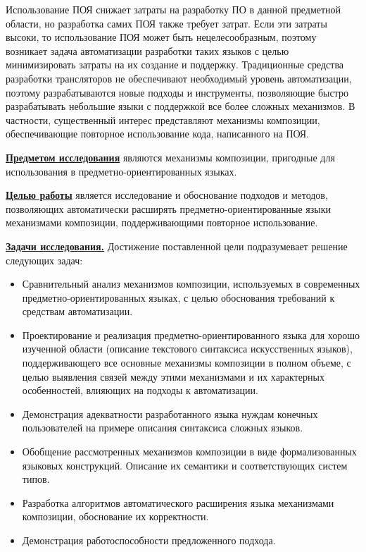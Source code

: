 \documentclass[12pt,a4paper]{article}
\theoremstyle{definition}
\theoremstyle{plain}
\newcommand{\afsubsection}[1]{\par \textbf{\underline{#1}}}
\begin{document}
Использование ПОЯ снижает затраты на разработку ПО в данной предметной области, но разработка самих ПОЯ также требует затрат. Если эти затраты высоки, то использование ПОЯ может быть нецелесообразным, поэтому возникает задача автоматизации разработки таких языков с целью минимизировать затраты на их создание и поддержку. Традиционные средства разработки трансляторов не обеспечивают необходимый уровень автоматизации, поэтому разрабатываются новые подходы и инструменты, позволяющие быстро разрабатывать небольшие языки с поддержкой все более сложных механизмов. В частности, существенный интерес представляют механизмы композиции, обеспечивающие повторное использование кода, написанного на ПОЯ. %

\afsubsection{Предметом исследования} являются механизмы композиции, пригодные для использования в предметно-ориентированных языках.

\afsubsection{Целью работы} является исследование и обоснование подходов и методов, позволяющих автоматически расширять предметно-ориентированные языки механизмами композиции, поддерживающими повторное использование.

\afsubsection{Задачи исследования.} Достижение поставленной цели подразумевает решение следующих задач:
\begin{itemize}
\item Сравнительный анализ механизмов композиции, используемых в современных предметно-ориентированных языках, с целью обоснования требований к средствам автоматизации.
\item Проектирование и реализация предметно-ориентированного языка для хорошо изученной области (описание текстового синтаксиса искусственных языков), поддерживающего все основные механизмы композиции в полном объеме, с целью выявления связей между этими механизмами и их характерных особенностей, влияющих на подходы к автоматизации.
\item Демонстрация адекватности разработанного языка нуждам конечных пользователей на примере описания синтаксиса сложных языков.
\item Обобщение рассмотренных механизмов композиции в виде формализованных языковых конструкций. Описание их семантики и соответствующих систем типов.
\item Разработка алгоритмов автоматического расширения языка механизмами композиции, обоснование их корректности.
\item Демонстрация работоспособности предложенного подхода.
\end{itemize}
\end{document}
